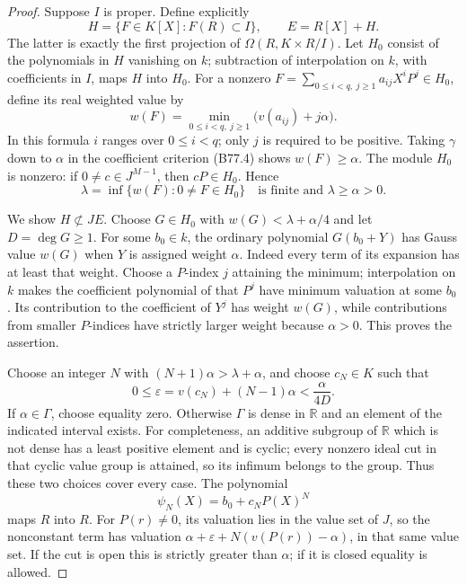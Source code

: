 \begin{proof}
Suppose $I$ is proper. Define explicitly
\[
 H=\{F\in K[X]:F(R)\subset I\},\qquad E=R[X]+H.
\]
The latter is exactly the first projection of $\Omega(R,K\times R/I)$.
Let $H_0$ consist of the polynomials in $H$ vanishing on $k$; subtraction
of interpolation on $k$, with coefficients in $I$, maps $H$ into $H_0$.
For a nonzero $F=\sum_{0\le i<q,\ j\ge1}a_{ij}X^iP^j\in H_0$, define its real
weighted value by
\[
             w(F)=\min_{0\le i<q,\ j\ge1}\bigl(v(a_{ij})+j\alpha\bigr).
\]
In this formula $i$ ranges over $0\le i<q$; only $j$ is required to
be positive. Taking $\gamma$ down to $\alpha$ in the coefficient
criterion (B77.4) shows $w(F)\ge\alpha$.
The module $H_0$ is nonzero: if $0\ne c\in J^{M-1}$, then $cP\in H_0$.
Hence
\[
             \lambda=\inf\{w(F):0\ne F\in H_0\}
                   \quad\text{is finite and }\lambda\ge\alpha>0.
                                                               \tag{B77.5}
\]

We show $H\not\subset JE$. Choose $G\in H_0$ with
$w(G)<\lambda+\alpha/4$ and let $D=\deg G\ge1$.
For some $b_0\in k$, the ordinary polynomial $G(b_0+Y)$ has Gauss
value $w(G)$ when $Y$ is assigned weight $\alpha$.
Indeed every term of its expansion has at least that weight. Choose
a $P$-index $j$ attaining the minimum; interpolation on $k$ makes the
coefficient polynomial of that $P^j$ have minimum valuation at some
$b_0$. Its contribution to the coefficient of $Y^j$ has weight
$w(G)$, while contributions from smaller $P$-indices have strictly
larger weight because $\alpha>0$. This proves the assertion.

Choose an integer $N$ with $(N+1)\alpha>\lambda+\alpha$, and choose
$c_N\in K$ such that
\[
        0\le\varepsilon=v(c_N)+(N-1)\alpha<\frac\alpha{4D}.
                                                               \tag{B77.6}
\]
If $\alpha\in\Gamma$, choose equality zero. Otherwise $\Gamma$ is
dense in $\mathbb R$ and an element of the indicated interval exists.
For completeness, an additive subgroup of $\mathbb R$ which is not
dense has a least positive element and is cyclic; every nonzero ideal
cut in that cyclic value group is attained, so its infimum belongs
to the group. Thus these two choices cover every case.
The polynomial
\[
                       \psi_N(X)=b_0+c_NP(X)^N
\]
maps $R$ into $R$. For $P(r)\ne0$, its valuation lies in the value set
of $J$, so the nonconstant term has valuation
$\alpha+\varepsilon+N(v(P(r))-\alpha)$, in that same value set.
If the cut is open this is strictly greater than $\alpha$; if it is
closed equality is allowed.


\end{proof}
